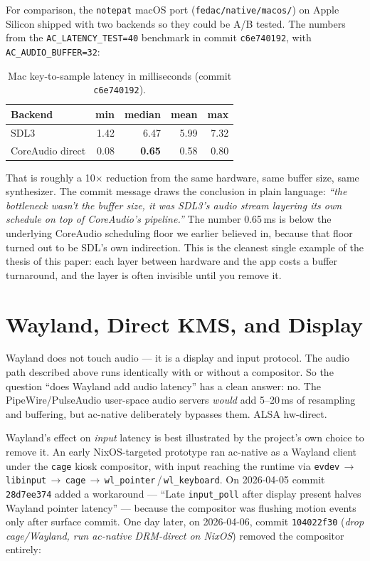 \documentclass[10pt,letterpaper,twocolumn]{article}
\begin{document}
For comparison, the \texttt{notepat} macOS port (\texttt{fedac/native/macos/}) on Apple Silicon shipped with two backends so they could be A/B tested. The numbers from the \texttt{AC\_LATENCY\_TEST=40} benchmark in commit \texttt{c6e740192}, with \texttt{AC\_AUDIO\_BUFFER=32}:

\begin{table}[h]
\small
\centering
\begin{tabular}{lrrrr}
\toprule
\textbf{Backend} & \textbf{min} & \textbf{median} & \textbf{mean} & \textbf{max} \\
\midrule
SDL3~\citep{sdl3} & 1.42 & 6.47 & 5.99 & 7.32 \\
CoreAudio direct & 0.08 & \textbf{0.65} & 0.58 & 0.80 \\
\bottomrule
\end{tabular}
\caption{Mac key-to-sample latency in milliseconds (commit \texttt{c6e740192}).}
\label{tab:macos}
\end{table}

That is roughly a 10$\times$ reduction from the same hardware, same buffer size, same synthesizer. The commit message draws the conclusion in plain language: \emph{``the bottleneck wasn't the buffer size, it was SDL3's audio stream layering its own schedule on top of CoreAudio's pipeline.''} The number 0.65\,ms is below the underlying CoreAudio scheduling floor we earlier believed in, because that floor turned out to be SDL's own indirection. This is the cleanest single example of the thesis of this paper: each layer between hardware and the app costs a buffer turnaround, and the layer is often invisible until you remove it.


\section{Wayland, Direct KMS, and Display}
\label{sec:wayland}

Wayland does not touch audio --- it is a display and input protocol. The audio path described above runs identically with or without a compositor. So the question ``does Wayland add audio latency'' has a clean answer: no. The PipeWire/PulseAudio user-space audio servers \emph{would} add 5--20\,ms of resampling and buffering, but ac-native deliberately bypasses them. ALSA hw-direct.

Wayland's effect on \emph{input} latency is best illustrated by the project's own choice to remove it. An early NixOS-targeted prototype ran ac-native as a Wayland client under the \texttt{cage} kiosk compositor, with input reaching the runtime via \texttt{evdev}\,$\rightarrow$\,\texttt{libinput}\,$\rightarrow$\,\texttt{cage}\,$\rightarrow$\,\texttt{wl\_pointer}\,/\,\texttt{wl\_keyboard}. On 2026-04-05 commit \texttt{28d7ee374} added a workaround --- ``Late \texttt{input\_poll} after display present halves Wayland pointer latency'' --- because the compositor was flushing motion events only after surface commit. One day later, on 2026-04-06, commit \texttt{104022f30} (\emph{drop cage/Wayland, run ac-native DRM-direct on NixOS}) removed the compositor entirely:
\end{document}

